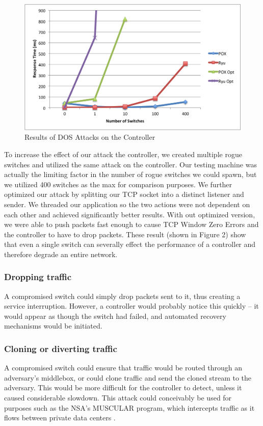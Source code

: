 \begin{figure}
  \includegraphics[width=\linewidth]{DOSattack.png}
  \caption{Results of DOS Attacks on the Controller \cite{protocol}}
  \label{fig:DOSattacks}
\end{figure}

   To increase the effect of our attack the controller, we created multiple rogue switches and utilized the same attack on the controller. Our testing machine was actually the limiting factor in the number of rogue switches we could spawn, but we utilized 400 switches as the max for comparison purposes.  We further optimized our attack by splitting our TCP socket into a distinct listener and sender. We threaded our application so the two actions were not dependent on each other and achieved significantly better results. With out optimized version, we were able to push packets fast enough to cause TCP Window Zero Errors and the controller to have to drop packets.  These result (shown in Figure 2) show that even a single switch can severally effect the performance of a controller and therefore degrade an entire network. 
   
\subsubsection{Dropping traffic} 
A compromised switch could simply drop packets sent to it, thus creating a service interruption. However, a controller would probably notice this quickly -- it would appear as though the switch had failed, and automated recovery mechanisms would be initiated.

\subsubsection{Cloning or diverting traffic}
A compromised switch could ensure that traffic would be routed through an adversary’s middlebox, or could clone traffic and send the cloned stream to the adversary. This would be more difficult for the controller to detect, unless it caused considerable slowdown. This attack could conceivably be used for purposes such as the NSA’s MUSCULAR program, which intercepts traffic as it flows between private data centers \cite{muscular}. 

